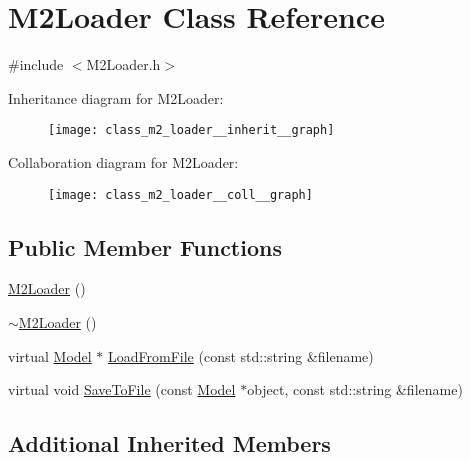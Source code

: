 \hypertarget{class_m2_loader}{\section{M2\+Loader Class Reference}
\label{class_m2_loader}
}


{\ttfamily \#include $<$M2\+Loader.\+h$>$}



Inheritance diagram for M2\+Loader\+:\nopagebreak
\begin{figure}[H]
\begin{center}
\leavevmode
\texttt{[image: class\_m2\_loader\_\_inherit\_\_graph]}
\end{center}
\end{figure}


Collaboration diagram for M2\+Loader\+:\nopagebreak
\begin{figure}[H]
\begin{center}
\leavevmode
\texttt{[image: class\_m2\_loader\_\_coll\_\_graph]}
\end{center}
\end{figure}
\subsection*{Public Member Functions}
\begin{DoxyCompactItemize}
\item 
\hyperlink{class_m2_loader_a63ae7581a76788cdabd2b4714ecef07e}{M2\+Loader} ()
\item 
\hyperlink{class_m2_loader_a1f48785fb506655a514716b4eeadb47d}{$\sim$\+M2\+Loader} ()
\item 
virtual \hyperlink{class_agmd_1_1_model}{Model} $\ast$ \hyperlink{class_m2_loader_ac69f9a9a4375fd799cb750778846ab36}{Load\+From\+File} (const std\+::string \&filename)
\item 
virtual void \hyperlink{class_m2_loader_abe67ca625f57453aae78b72d0d10347c}{Save\+To\+File} (const \hyperlink{class_agmd_1_1_model}{Model} $\ast$object, const std\+::string \&filename)
\end{DoxyCompactItemize}
\subsection*{Additional Inherited Members}


